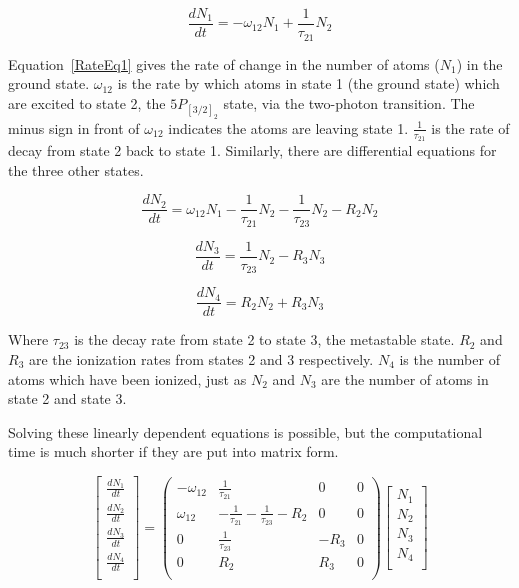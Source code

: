 \documentclass[prb,preprint]{revtex4-1}
\begin{document}
\begin{equation}
\label{RateEq1}
\frac{dN_1}{dt} = -\omega_{12}N_1 + \frac{1}{\tau_{21}}N_2
\end{equation}

Equation~\ref{RateEq1} gives the rate of change in the number of atoms ($N_1$) in the ground state. $\omega_{12}$ is the rate by which atoms in state 1 (the ground state) which are excited to state 2, the $5P_{[3/2]_2}$ state, via the two-photon transition. The minus sign in front of $\omega_{12}$ indicates the atoms are leaving state 1. $\frac{1}{\tau_{21}}$ is the rate of decay from state 2 back to state 1. Similarly, there are differential equations for the three other states.

\begin{equation}
\label{RateEq2}
\frac{dN_2}{dt} = \omega_{12}N_1 -  \frac{1}{\tau_{21}}N_2 - \frac{1}{\tau_{23}}N_2 - R_2N_2
\end{equation}

\begin{equation}
\label{RateEq3}
\frac{dN_3}{dt} =  \frac{1}{\tau_{23}}N_2 - R_3N_3
\end{equation}

\begin{equation}
\label{RateEq4}
\frac{dN_4}{dt} = R_2N_2 + R_3N_3
\end{equation}

Where $\tau_{23}$ is the decay rate from state 2 to state 3, the metastable state. $R_2$ and $R_3$ are the ionization rates from states 2 and 3 respectively. $N_4$ is the number of atoms which have been ionized, just as $N_2$ and $N_3$ are the number of atoms in state 2 and state 3.

Solving these linearly dependent equations is possible, but the computational time is much shorter if they are put into matrix form.

\begin{equation}
\label{RateEqMatrix}
\begin{bmatrix}
	\frac{dN_1}{dt} \\
	\frac{dN_2}{dt} \\
	\frac{dN_3}{dt} \\
	\frac{dN_4}{dt} \\
\end{bmatrix}
=
\begin{pmatrix}
	-\omega_{12} & \frac{1}{\tau_{21}}  & 0 &  0   \\
	\omega_{12}  & -\frac{1}{\tau_{21}}- \frac{1}{\tau_{23}}-R_2 & 0 & 0 \\
	0  &  \frac{1}{\tau_{23}}  & - R_3 & 0 \\
	0  &  R_2  & R_3 & 0  \\
\end{pmatrix}
\begin{bmatrix}
	N_1 \\
	N_2 \\
	N_3 \\
	N_4 \\
\end{bmatrix}
\end{equation}
\end{document}
